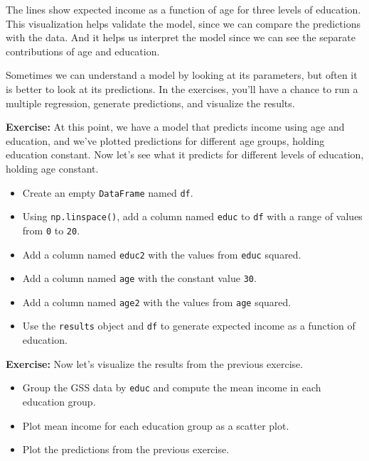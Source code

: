 The lines show expected income as a function of age for three levels of
education. This visualization helps validate the model, since we can
compare the predictions with the data. And it helps us interpret the
model since we can see the separate contributions of age and education.

Sometimes we can understand a model by looking at its parameters, but
often it is better to look at its predictions. In the exercises, you'll
have a chance to run a multiple regression, generate predictions, and
visualize the results.

\textbf{Exercise:} At this point, we have a model that predicts income
using age and education, and we've plotted predictions for different age
groups, holding education constant. Now let's see what it predicts for
different levels of education, holding age constant.

\begin{itemize}
\item
  Create an empty \passthrough{\lstinline!DataFrame!} named
  \passthrough{\lstinline!df!}.
\item
  Using \passthrough{\lstinline!np.linspace()!}, add a column named
  \passthrough{\lstinline!educ!} to \passthrough{\lstinline!df!} with a
  range of values from \passthrough{\lstinline!0!} to
  \passthrough{\lstinline!20!}.
\item
  Add a column named \passthrough{\lstinline!educ2!} with the values
  from \passthrough{\lstinline!educ!} squared.
\item
  Add a column named \passthrough{\lstinline!age!} with the constant
  value \passthrough{\lstinline!30!}.
\item
  Add a column named \passthrough{\lstinline!age2!} with the values from
  \passthrough{\lstinline!age!} squared.
\item
  Use the \passthrough{\lstinline!results!} object and
  \passthrough{\lstinline!df!} to generate expected income as a function
  of education.
\end{itemize}

\textbf{Exercise:} Now let's visualize the results from the previous
exercise.

\begin{itemize}
\item
  Group the GSS data by \passthrough{\lstinline!educ!} and compute the
  mean income in each education group.
\item
  Plot mean income for each education group as a scatter plot.
\item
  Plot the predictions from the previous exercise.
\end{itemize}

